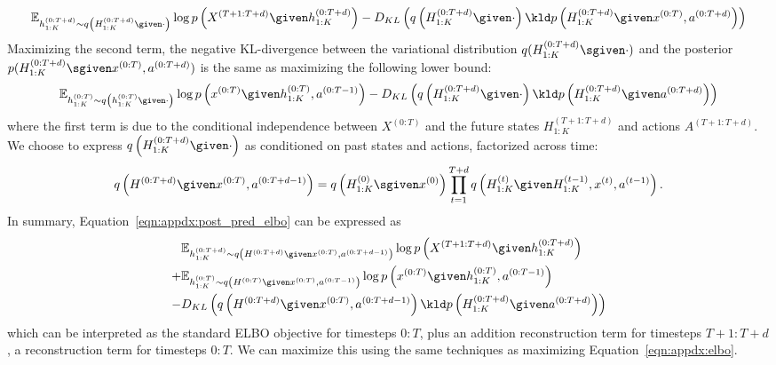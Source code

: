 \footnotesize
\begin{align*}
    \mathbb{E}_{h_{1:K}^{(0:T+d)} \sim q\left(H_{1:K}^{(0:T+d)} \given \cdot \right)} \log p\left(X^{(T+1:T+d)} \given h_{1:K}^{(0:T+d)}\right) -D_{KL}\left(q\left(H_{1:K}^{(0:T+d)} \given \cdot \right) \kld p\left(H_{1:K}^{(0:T+d)} \given x^{(0:T)}, a^{(0:T+d)}\right) \right)
\end{align*}
\normalsize
Maximizing the second term, the negative KL-divergence between the variational distribution $q(H_{1:K}^{(0:T+d)} \sgiven \cdot)$ and the posterior $p(H_{1:K}^{(0:T+d)} \sgiven x^{(0:T)}, a^{(0:T+d)})$ is the same as maximizing the following lower bound:
\footnotesize
\begin{equation} \label{eqn:appdx:neg_kl}
    \mathbb{E}_{h_{1:K}^{(0:T)} \sim q\left(h_{1:K}^{(0:T)} \given \cdot \right)} \log p\left(x^{(0:T)} \given h_{1:K}^{(0:T)}, a^{(0:T-1)}\right) - D_{KL}\left(q\left(H_{1:K}^{(0:T+d)} \given \cdot \right) \kld p\left(H_{1:K}^{(0:T+d)} \given a^{(0:T+d)}\right) \right)
\end{equation}
\normalsize
where the first term is due to the conditional independence between $X^{(0:T)}$ and the future states $H_{1:K}^{(T+1:T+d)}$ and actions $A^{(T+1:T+d)}$.
We choose to express $q\left(H_{1:K}^{(0:T+d)} \given \cdot \right)$ as conditioned on past states and actions, factorized across time:
\footnotesize
\begin{equation*}
    q\left(H^{(0:T+d)} \given x^{(0:T)}, a^{(0:T+d-1)}\right) = q\left(H^{(0)}_{1:K} \sgiven x^{(0)}\right) \prod_{t=1}^{T+d} q\left(H^{(t)}_{1:K} \given H^{(t-1)}_{1:K}, x^{(t)}, a^{(t-1)}\right).
\end{equation*}
\normalsize
In summary, Equation~\ref{eqn:appdx:post_pred_elbo} can be expressed as
\footnotesize
\begin{align*}
    &\mathbb{E}_{h_{1:K}^{(0:T+d)} \sim q\left(H^{(0:T+d)} \given x^{(0:T)}, a^{(0:T+d-1)}\right)} \log p\left(X^{(T+1:T+d)} \given h_{1:K}^{(0:T+d)}\right)\\
    + &\mathbb{E}_{h_{1:K}^{(0:T)} \sim q\left(H^{(0:T)} \given x^{(0:T)}, a^{(0:T-1)}\right)} \log p\left(x^{(0:T)} \given h_{1:K}^{(0:T)}, a^{(0:T-1)}\right) \\
    - &D_{KL}\left(q\left(H^{(0:T+d)} \given x^{(0:T)}, a^{(0:T+d-1)}\right) \kld p\left(H_{1:K}^{(0:T+d)} \given a^{(0:T+d)}\right) \right)
\end{align*}
\normalsize
which can be interpreted as the standard ELBO objective for timesteps $0:T$, plus an addition reconstruction term for timesteps $T+1:T+d$, a reconstruction term for timesteps $0:T$.
We can maximize this using the same techniques as maximizing Equation~\ref{eqn:appdx:elbo}.

